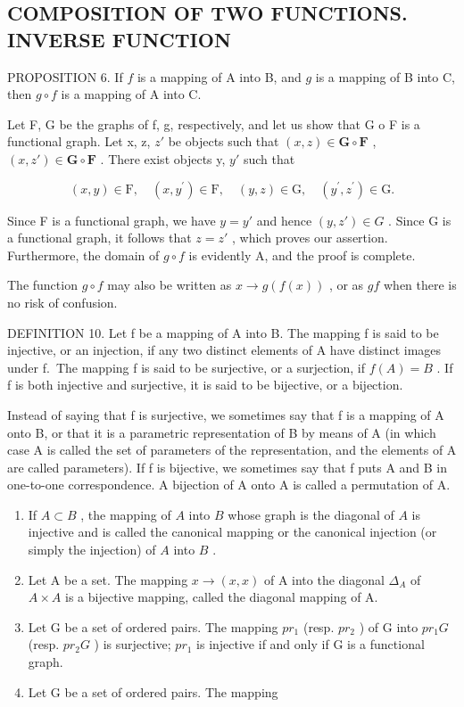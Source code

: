 \subsection{COMPOSITION OF TWO FUNCTIONS. INVERSE FUNCTION}

PROPOSITION 6. If \(f\) is a mapping of A into B, and \(g\) is a mapping of B into C, then \(g \circ f\) is a mapping of A into C.

Let F, G be the graphs of f, g, respectively, and let us show that G o F is a functional graph. Let x, z, \(z'\) be objects such that \((x, z) \in \mathbf{G} \circ \mathbf{F}\) , \((x, z') \in \mathbf{G} \circ \mathbf{F}\) . There exist objects y, \(y'\) such that

\[
(x, y) \in \mathrm{F}, \quad (x, y ^ {\prime}) \in \mathrm{F}, \quad (y, z) \in \mathrm{G}, \quad (y ^ {\prime}, z ^ {\prime}) \in \mathrm{G}.
\]

Since F is a functional graph, we have \(y = y'\) and hence \((y, z') \in G\) . Since G is a functional graph, it follows that \(z = z'\) , which proves our assertion. Furthermore, the domain of \(g \circ f\) is evidently A, and the proof is complete.

The function \(g \circ f\) may also be written as \(x \to g(f(x))\) , or as \(gf\) when there is no risk of confusion.

DEFINITION 10. Let f be a mapping of A into B. The mapping f is said to be injective, or an injection, if any two distinct elements of A have distinct images under f.~The mapping f is said to be surjective, or a surjection, if \(f(A) = B\) . If f is both injective and surjective, it is said to be bijective, or a bijection.

Instead of saying that f is surjective, we sometimes say that f is a mapping of A onto B, or that it is a parametric representation of B by means of A (in which case A is called the set of parameters of the representation, and the elements of A are called parameters). If f is bijective, we sometimes say that f puts A and B in one-to-one correspondence. A bijection of A onto A is called a permutation of A.


\begin{enumerate}
\def\labelenumi{(\arabic{enumi})}
\item
  If \(A \subset B\) , the mapping of \(A\) into \(B\) whose graph is the diagonal of \(A\) is injective and is called the canonical mapping or the canonical injection (or simply the injection) of \(A\) into \(B\) .
\item
  Let A be a set. The mapping \(x \to (x, x)\) of A into the diagonal \(\Delta_{A}\) of \(A \times A\) is a bijective mapping, called the diagonal mapping of A.
\item
  Let G be a set of ordered pairs. The mapping \(pr_{1}\) (resp. \(pr_{2}\) ) of G into \(pr_{1}G\) (resp. \(pr_{2}G\) ) is surjective; \(pr_{1}\) is injective if and only if G is a functional graph.
\item
  Let G be a set of ordered pairs. The mapping
\end{enumerate}


